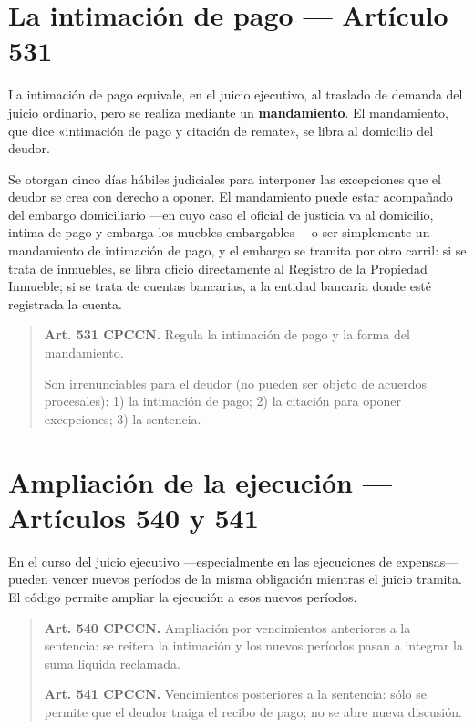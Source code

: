 \documentclass[12pt,oneside]{book}
\begin{document}
\section{La intimación de pago --- Artículo 531}

La intimación de pago equivale, en el juicio ejecutivo, al traslado de demanda del juicio ordinario, pero se realiza mediante un \textbf{mandamiento}. El mandamiento, que dice «intimación de pago y citación de remate», se libra al domicilio del deudor.

Se otorgan cinco días hábiles judiciales para interponer las excepciones que el deudor se crea con derecho a oponer. El mandamiento puede estar acompañado del embargo domiciliario ---en cuyo caso el oficial de justicia va al domicilio, intima de pago y embarga los muebles embargables--- o ser simplemente un mandamiento de intimación de pago, y el embargo se tramita por otro carril: si se trata de inmuebles, se libra oficio directamente al Registro de la Propiedad Inmueble; si se trata de cuentas bancarias, a la entidad bancaria donde esté registrada la cuenta.

\begin{quote}
\textbf{Art. 531 CPCCN.} Regula la intimación de pago y la forma del mandamiento.

Son irrenunciables para el deudor (no pueden ser objeto de acuerdos procesales): 1) la intimación de pago; 2) la citación para oponer excepciones; 3) la sentencia.
\end{quote}

\section{Ampliación de la ejecución --- Artículos 540 y 541}

En el curso del juicio ejecutivo ---especialmente en las ejecuciones de expensas--- pueden vencer nuevos períodos de la misma obligación mientras el juicio tramita. El código permite ampliar la ejecución a esos nuevos períodos.

\begin{quote}
\textbf{Art. 540 CPCCN.} Ampliación por vencimientos anteriores a la sentencia: se reitera la intimación y los nuevos períodos pasan a integrar la suma líquida reclamada.

\textbf{Art. 541 CPCCN.} Vencimientos posteriores a la sentencia: sólo se permite que el deudor traiga el recibo de pago; no se abre nueva discusión.
\end{quote}
\end{document}
